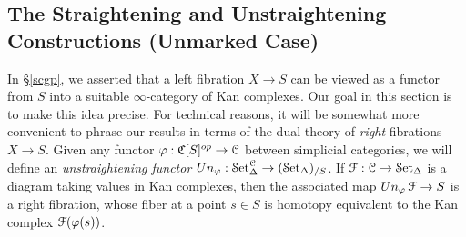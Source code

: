 

\subsection{The Straightening and Unstraightening Constructions (Unmarked Case)}\label{rightstraight}

In \S \ref{scgp}, we asserted that a left fibration $X \rightarrow S$ can be viewed as a functor
from $S$ into a suitable $\infty$-category of Kan complexes. Our goal in this section is to make this idea precise. For technical reasons, it will be somewhat more convenient to phrase our results
in terms of the dual theory of {\em right} fibrations $X \rightarrow S$.
Given any functor $\varphi: \operatorname{\mathfrak{C}}[S]^{op} \rightarrow \operatorname{\mathcal{C}}$ between simplicial categories,
we will define an {\it unstraightening functor} $Un_{\varphi}: \operatorname{\mathcal{S}et}_{\Delta}^{\operatorname{\mathcal{C}}} \rightarrow
(\operatorname{\mathcal{S}et_{\Delta}})_{/S}$. If $\operatorname{\mathcal{F}}: \operatorname{\mathcal{C}} \rightarrow \operatorname{\mathcal{S}et_{\Delta}}$ is a diagram taking values in Kan complexes, then
the associated map $Un_{\varphi} \operatorname{\mathcal{F}} \rightarrow S$ is a right fibration, whose fiber at
a point $s \in S$ is homotopy equivalent to the Kan complex $\operatorname{\mathcal{F}}( \varphi(s) )$.

